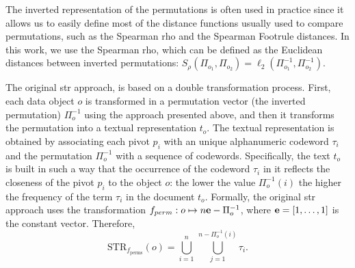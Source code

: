 The inverted representation of the permutations is often used in practice since it allows us to easily define most of the distance functions usually used to compare permutations, such as the Spearman rho and the Spearman Footrule distances.
In this work, we use the Spearman rho, which can be defined as the Euclidean distances between inverted permutations: $S_\rho (\Pi_{o_1},\Pi_{o_2})=\ell_2(\Pi^{-1}_{o_1},\Pi^{-1}_{o_2})$.

The original \gls{str} approach, \cite{gennaro2010approach} is based on a double transformation process.
First, each data object $o$ is transformed in a permutation vector (the inverted permutation) $\Pi^{-1}_{o}$ using the approach presented above, and then it transforms the permutation into a textual representation $t_o$.
The textual representation is obtained by associating each pivot $p_i$ with an unique alphanumeric codeword $\tau_i$ and the permutation $\Pi^{-1}_{o}$ with a sequence of codewords.
Specifically, the text $t_o$ is built in such a way that the occurrence of the codeword $\tau_i$ in it reflects the closeness of the pivot $p_i$ to the object $o$: the lower the value $\Pi^{-1}_{o}(i)$ the higher the frequency of the term $\tau_i$ in the document $t_o$.
Formally, the original \gls{str} approach uses the transformation
$
f_{perm} : o \mapsto n\e - \Pi^{-1}_{o} %
$,
where $\mathbf{e}=[1,\dots, 1]$ is the constant vector.
Therefore,
\begin{equation}
\text{STR}_{f_\text{perms}}(o)=\bigcup_{i=1}^n\,\bigcup_{j=1}^{n-\Pi^{-1}_{o}(i)} \tau_i.
\end{equation}

